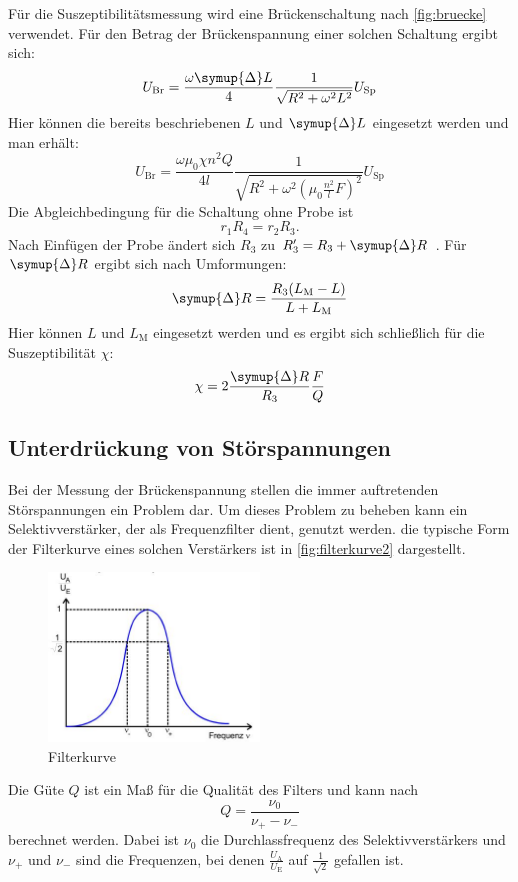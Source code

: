 Für die Suszeptibilitätsmessung wird eine Brückenschaltung nach \autoref{fig:bruecke} verwendet. Für den Betrag der Brückenspannung einer solchen Schaltung ergibt sich:
\begin{equation}
U_\text{Br} = \frac{\omega \symup{\Delta} L}{4} \frac{1}{\sqrt{R^2 + {\omega}^2 L^2 }} U_\text{Sp}
\end{equation}
Hier können die bereits beschriebenen $L$  und $\symup{\Delta} L$ eingesetzt werden und man erhält:
\begin{equation}
U_\text{Br} = \frac{\omega \mu_0 \chi n^2 Q}{4l} \frac{1}{\sqrt{R^2 + {\omega}^2(\mu_0 \frac{n^2}{l}F)^2}} U_\text{Sp}
\end{equation}
Die Abgleichbedingung für die Schaltung ohne Probe ist
\begin{equation}
    r_1 R_4 = r_2 R_3 .
\end{equation}
Nach Einfügen der Probe ändert sich $R_3$ zu $R'_3 = R_3 + \symup{\Delta}R$ .
Für $\symup{\Delta}R$ ergibt sich nach Umformungen:
\begin{equation}
    \symup{\Delta}R = \frac{R_3 (L_\text{M} - L)}{L + L_\text{M}} 
\end{equation}
Hier können $L$ und $L_\text{M}$ eingesetzt werden und es ergibt sich schließlich für die Suszeptibilität $\chi$:
\begin{equation}
    \label{eqn:chi}
    \chi = 2 \frac{\symup{\Delta}R}{R_3} \frac{F}{Q}
\end{equation}

\subsection{Unterdrückung von Störspannungen}
Bei der Messung der Brückenspannung stellen die immer auftretenden Störspannungen ein Problem dar. Um dieses Problem zu beheben kann ein Selektivverstärker, der als Frequenzfilter dient, genutzt werden. die typische Form der Filterkurve eines solchen Verstärkers ist in \autoref{fig:filterkurve2} dargestellt.
\begin{figure}[H]
    \centering
    \includegraphics[width=0.5\textwidth]{content/filterkurve.jpg}
    \caption{Filterkurve \cite{versuchsanleitung}}
    \label{fig:filterkurve2}
  \end{figure}
Die Güte $Q$ ist ein Maß für die Qualität des Filters und kann nach 
  \begin{equation}
    \label{eqn:güte}
    Q = \frac{\nu_0}{\nu_+ - \nu_-}
\end{equation}
berechnet werden. Dabei ist $\nu_0$ die Durchlassfrequenz des Selektivverstärkers und $\nu_+$ und $\nu_-$ sind die Frequenzen,
bei denen $\frac{U_\text{A}}{U_\text{E}}$ auf $\frac{1}{\sqrt{2}}$ gefallen ist.